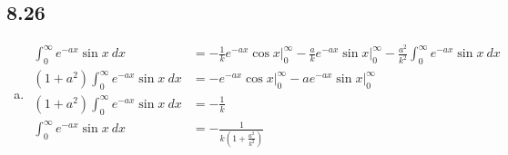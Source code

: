 \documentclass[10pt]{mypackage}
\begin{document}
\subsection{8.26}%
\begin{enumerate}[(a)]
  \item 
    \begin{align*}
      \int_{0}^{\infty} e^{-ax}\sin x\:dx &= -\frac{1}{k}e^{-ax}\cos x\bigr\vert_{0}^{\infty} - \frac{a}{k}e^{-ax}\sin x\bigr\vert_{0}^{\infty} - \frac{a^2}{k^2}\int_{0}^{\infty} e^{-ax}\sin x\:dx\\
      \left(1 + a^2\right)\int_{0}^{\infty}e^{-ax} \sin x\:dx &= -e^{-ax}\cos x\bigr\vert_{0}^{\infty} - ae^{-ax}\sin x\bigr\vert_{0}^{\infty}\\
      \left(1 + a^2\right)\int_{0}^{\infty}e^{-ax} \sin x\:dx &= -\frac{1}{k}\\
      \int_{0}^{\infty} e^{-ax}\sin x\:dx &= -\frac{1}{k\left(1+\frac{a^2}{k^2}\right)}
    \end{align*}
\end{enumerate}
\end{document}
